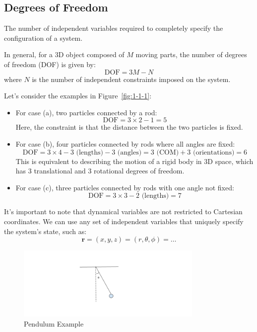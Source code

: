 \subsection{Degrees of Freedom}

\begin{definition}
     The number of independent variables required to completely specify the configuration of a system.
\end{definition}

In general, for a 3D object composed of $M$ moving parts, the number of degrees of freedom (DOF) is given by:
\[
    \text{DOF} = 3M -N
\]
where $N$ is the number of independent constraints imposed on the system.

Let's consider the examples in Figure~\ref{fig:1-1-1}:

\begin{itemize}
    \item For case (a), two particles connected by a rod:
        \[
             \text{DOF} = 3 \times 2 - 1 = 5
        \]
        Here, the constraint is that the distance between the two particles is fixed.
    \item For case (b), four particles connected by rods where all angles are fixed:
        \[
            \text{DOF} = 3 \times 4 - 3 \text{ (lengths)} - 3 \text{ (angles)} = 3 \text{ (COM)} + 3 \text{ (orientations)} = 6
        \]
        This is equivalent to describing the motion of a rigid body in 3D space, which has 3 translational and 3 rotational degrees of freedom.
    \item For case (c), three particles connected by rods with one angle not fixed:
    \[
            \text{DOF} = 3 \times 3 - 2 \text{ (lengths)} = 7
        \]
\end{itemize}

It's important to note that dynamical variables are not restricted to Cartesian coordinates.  We can use any set of independent variables that uniquely specify the system's state, such as:
\[
    \mathbf{r} = (x, y, z) = (r, \theta, \phi) = \dots
\]

\begin{figure}[ht]
  \centering
  \includegraphics[width=0.8\textwidth]{images/1-1-2.png}
  \caption{Pendulum Example}
  \label{fig:1-1-2}
\end{figure}

